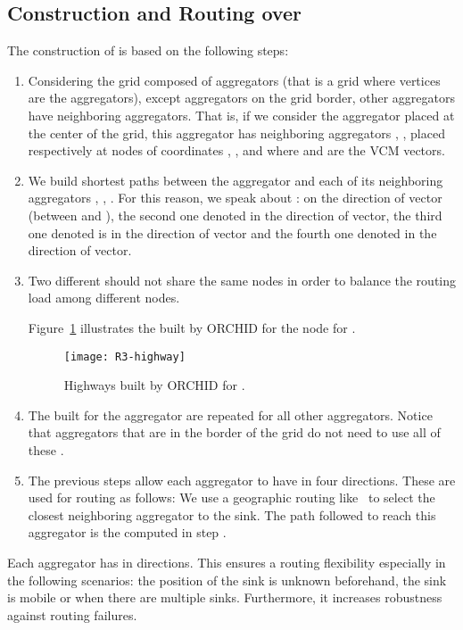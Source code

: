\subsection{ Construction and Routing over }\label{sec:highCon}


The construction of  is based on the following steps:


\begin{enumerate}
\item Considering the grid composed of aggregators (that is a grid where vertices are the aggregators), except aggregators on the grid border, other aggregators have  neighboring aggregators. That is, if we consider the aggregator  placed at the center of the grid, this aggregator has  neighboring aggregators , ,  placed respectively at nodes of coordinates , ,  and  where  and  are the VCM vectors. 
\item We build  shortest paths between the aggregator  and each of its neighboring aggregators , , . For this reason, we speak about  :  on the direction of  vector (between  and ), the second one denoted  in the direction of  vector, the third one denoted  is in the direction of  vector and the fourth one denoted  in the direction of  vector.
\item Two different  should not share the same nodes in order to balance the routing load among different nodes.

Figure~\ref{fig:highway-R3} illustrates the  built by ORCHID for the node  for .

\begin{figure}[h!]
\centering
\texttt{[image: R3-highway]}
\caption{Highways built by ORCHID for .
\label{fig:highway-R3}}
\end{figure}

\item The  built for the aggregator  are repeated for all other aggregators. Notice that aggregators that are in the border of the grid do not need to use all of these .
\item The previous steps allow each aggregator to have  in four directions. These  are used for routing as follows: We use a geographic routing like~\cite{geoRou} to select the closest neighboring aggregator to the sink. The path followed to reach this aggregator is the  computed in step .
\end{enumerate}

\begin{remark}
Each aggregator has  in  directions. This ensures a routing flexibility especially in the following scenarios: the position of the sink is unknown beforehand, the sink is mobile or when there are multiple sinks. Furthermore, it increases robustness against routing failures.
\end{remark}


